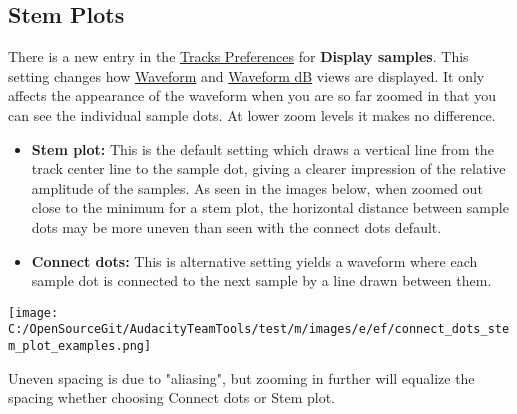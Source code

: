 \begin{multicols}{2}
\label{newXfeaturesXinXthisXreleaseXstemplots}
\subsection{Stem Plots}There is a new entry in the 
\hyperref[\foo{tracksXpreferencesX}]{Tracks Preferences}
 for \textbf{Display samples}.  This setting changes how 
\hyperref[\foo{audacityXwaveformX}]{Waveform}
 and 
\hyperref[\foo{audacityXwaveformXdb}]{Waveform dB}
 views are displayed.  It only affects the appearance of the waveform when you are so far zoomed in that you can see the individual sample dots.  At lower zoom levels it makes no difference.  

\begin{itemize}
\item \textbf{Stem plot:} This is the default setting which draws a vertical line from the track center line to the sample dot, giving a clearer impression of the relative amplitude of the samples. As seen in the images below, when zoomed out close to the minimum for a stem plot, the horizontal distance between sample dots may be more uneven than seen with the connect dots default.   
\item \textbf{Connect dots:} This is alternative setting yields a waveform where each sample dot is connected to the next sample by a line drawn between them.  
\end{itemize}
\par \protect\texttt{[image: C:/OpenSourceGit/AudacityTeamTools/test/m/images/e/ef/connect\_dots\_stem\_plot\_examples.png]}\par Uneven spacing is due to "aliasing", but zooming in further will equalize the spacing whether choosing Connect dots or Stem plot.
\label{newXfeaturesXinXthisXreleaseXmenus}

\end{multicols}
